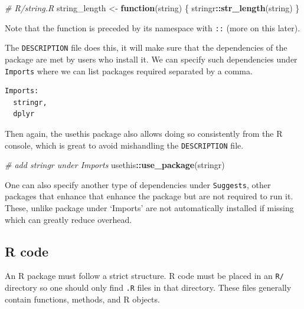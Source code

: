 \documentclass[
]{krantz}
\makeatletter
\newenvironment{Shaded}{\begin{snugshade}}{\end{snugshade}}
\newcommand{\CommentTok}[1]{\textcolor[rgb]{0.37,0.37,0.37}{\textit{#1}}}
\newcommand{\ControlFlowTok}[1]{\textcolor[rgb]{0.27,0.27,0.27}{\textbf{#1}}}
\newcommand{\KeywordTok}[1]{\textcolor[rgb]{0.27,0.27,0.27}{\textbf{#1}}}
\newcommand{\NormalTok}[1]{#1}
\newcommand{\OperatorTok}[1]{\textcolor[rgb]{0.43,0.43,0.43}{\textbf{#1}}}
\newcommand{\StringTok}[1]{\textcolor[rgb]{0.5,0.5,0.5}{#1}}
\newenvironment{kframe}{%
\medskip{}
\setlength{\fboxsep}{.8em}
 \def\at@end@of@kframe{}%
 \ifinner\ifhmode%
  \def\at@end@of@kframe{\end{minipage}}%
  \begin{minipage}{\columnwidth}%
 \fi\fi%
 \def\FrameCommand##1{\hskip\@totalleftmargin \hskip-\fboxsep
 \colorbox{shadecolor}{##1}\hskip-\fboxsep
     \hskip-\linewidth \hskip-\@totalleftmargin \hskip\columnwidth}%
 \MakeFramed {\advance\hsize-\width
   \@totalleftmargin\z@ \linewidth\hsize
   \@setminipage}}%
 {\par\unskip\endMakeFramed%
 \at@end@of@kframe}
\renewenvironment{Shaded}{\begin{kframe}}{\end{kframe}}
\newenvironment{rmdblock}[1]
  {
  \begin{itemize}
  \renewcommand{\labelitemi}{
    \raisebox{-.7\height}[0pt][0pt]{
      {\setkeys{Gin}{width=3em,keepaspectratio}\texttt{[image: images/\#1]}}
    }
  }
  \setlength{\fboxsep}{1em}
  \begin{kframe}
  \item
  }
  {
  \end{kframe}
  \end{itemize}
  }
\newenvironment{rmdnote}
  {\begin{rmdblock}{note}}
  {\end{rmdblock}}
\makeatother
\begin{document}
\begin{Shaded}
\begin{Highlighting}[]
\CommentTok{\# R/string.R}
\NormalTok{string\_length <{-}}\StringTok{ }\ControlFlowTok{function}\NormalTok{(string) \{}
\NormalTok{  stringr}\OperatorTok{::}\KeywordTok{str\_length}\NormalTok{(string)}
\NormalTok{\}}
\end{Highlighting}
\end{Shaded}

\begin{rmdnote}
Note that the function is preceded by its namespace with \texttt{::}
(more on this later).
\end{rmdnote}

The \texttt{DESCRIPTION} file does this, it will make sure that the dependencies of the package are met by users who install it. We can specify such dependencies under \texttt{Imports} where we can list packages required separated by a comma.

\begin{verbatim}
Imports:
  stringr,
  dplyr
\end{verbatim}

Then again, the usethis package also allows doing so consistently from the R console, which is great to avoid mishandling the \texttt{DESCRIPTION} file.

\begin{Shaded}
\begin{Highlighting}[]
\CommentTok{\# add stringr under Imports}
\NormalTok{usethis}\OperatorTok{::}\KeywordTok{use\_package}\NormalTok{(}\StringTok{\textquotesingle{}stringr\textquotesingle{}}\NormalTok{)}
\end{Highlighting}
\end{Shaded}

One can also specify another type of dependencies under \texttt{Suggests}, other packages that enhance that enhance the package but are not required to run it. These, unlike package under `Imports' are not automatically installed if missing which can greatly reduce overhead.

\hypertarget{basics-r-code}{%
\subsection{R code}\label{basics-r-code}}

An R package must follow a strict structure. R code must be placed in an \texttt{R/} directory so one should only find \texttt{.R} files in that directory. These files generally contain functions, methods, and R objects.
\end{document}
